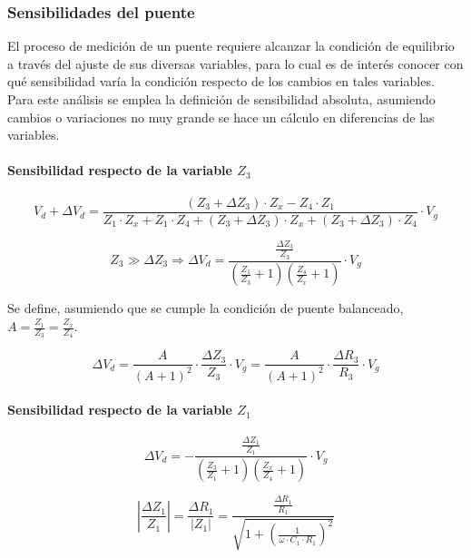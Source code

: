 \subsubsection{Sensibilidades del puente}
El proceso de medici\'on de un puente requiere alcanzar la condici\'on de equilibrio a trav\'es del ajuste de sus diversas variables, para lo cual es de inter\'es conocer con qu\'e sensibilidad var\'ia la condici\'on respecto de los cambios en tales variables. Para este an\'alisis se emplea la definici\'on de sensibilidad absoluta, asumiendo cambios o variaciones no muy grande se hace un c\'alculo en diferencias de las variables.

\paragraph{Sensibilidad respecto de la variable $Z_3$}

\begin{equation}
    V_d + \Delta V_d=\frac{(Z_3+ \Delta Z_3)\cdot Z_x - Z_4 \cdot Z_1}{Z_1 \cdot Z_x + Z_1 \cdot Z_4 + (Z_3+ \Delta Z_3)\cdot Z_x +(Z_3+ \Delta Z_3) \cdot Z_4} \cdot V_g
    \label{eq:Sensibilidad_Z3_1}
\end{equation}

\begin{equation}
     Z_3 \gg \Delta Z_3 \Rightarrow
    \Delta V_d = \frac{\frac{\Delta Z_3}{Z_3}}{\left(\frac{Z_1}{Z_3}+ 1\right)\left(\frac{Z_4}{Z_x} + 1\right)} \cdot V_g
\end{equation}

Se define, asumiendo que se cumple la condici\'on de puente balanceado, $A=\frac{Z_1}{Z_3}=\frac{Z_x}{Z_4}$.

\begin{equation}
\Delta V_d = \frac{A}{(A+1)^2} \cdot \frac{\Delta Z_3}{Z_3} \cdot V_g = \frac{A}{(A+1)^2} \cdot \frac{\Delta R_3}{R_3} \cdot V_g 
\label{eq:sens_z3_cabezapuente}
\end{equation}

\paragraph{Sensibilidad respecto de la variable $Z_1$}

\begin{equation}
    \Delta V_d = - \frac{\frac{\Delta Z_1}{Z_1}}{\left(\frac{Z_3}{Z_1}+ 1\right)\left(\frac{Z_x}{Z_4} + 1\right)} \cdot V_g
\end{equation}

 \begin{equation}
    \left| \frac{\Delta Z_1}{Z_1} \right| = \frac{\Delta R_1}{|Z_1|} = \frac{\frac{\Delta R_1}{R_1}}{\sqrt{1 + \left(\frac{1}{\omega \cdot C_1 \cdot R_1 }\right)^2}}
\end{equation}

